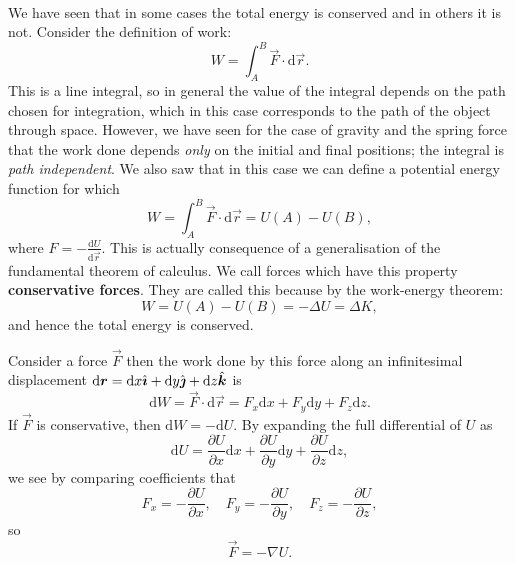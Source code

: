 \documentclass[../newtonian_mechanics.tex]{subfiles}
\begin{document}
        \paragraph{}
        We have seen that in some cases the total energy is conserved and in others it is not.
        Consider the definition of work:
        \begin{equation}
            W=\int_A^B \vec{F}\cdot\mathrm{d}\vec{r}.
        \end{equation}
        This is a line integral, so in general the value of the integral depends on the path chosen for integration, which in this case corresponds to the path of the object through space.
        However, we have seen for the case of gravity and the spring force that the work done depends \textit{only} on the initial and final positions; the integral is \textit{path independent}.
        We also saw that in this case we can define a potential energy function for which
        \begin{equation}
            W=\int_A^B \vec{F}\cdot\mathrm{d}\vec{r} = U(A) - U(B),
        \end{equation}
        where $F=-\frac{\mathrm{d}U}{\mathrm{d}\vec{r}}$.
        This is actually consequence of a generalisation of the fundamental theorem of calculus.
        We call forces which have this property \textbf{conservative forces}.
        They are called this because by the work-energy theorem:
        \begin{equation}
            W = U(A) - U(B) = -\Delta U = \Delta K,
        \end{equation}
        and hence the total energy is conserved.
        \begin{example}
            Consider a force $\vec{F}$ then the work done by this force along an infinitesimal displacement $\mathrm{d}\boldsymbol{r}=\mathrm{d}x\hat{\boldsymbol{\imath}}+\mathrm{d}y\hat{\boldsymbol{\jmath}}+\mathrm{d}z\hat{\boldsymbol{k}}$ is
            \begin{equation}
                \mathrm{d}W = \vec{F}\cdot\mathrm{d}\vec{r}=F_x\mathrm{d}x+F_y\mathrm{d}y+F_z\mathrm{d}z.
            \end{equation}
            If $\vec{F}$ is conservative, then $\mathrm{d}W=-\mathrm{d}U$. By expanding the full differential of $U$ as
            \begin{equation}
                \mathrm{d}U=\frac{\partial U}{\partial x}\mathrm{d}x+\frac{\partial U}{\partial y}\mathrm{d}y+\frac{\partial U}{\partial z}\mathrm{d}z,
            \end{equation}
            we see by comparing coefficients that
            \begin{equation}
                F_x=-\frac{\partial U}{\partial x}, \quad F_y=-\frac{\partial U}{\partial y}, \quad F_z=-\frac{\partial U}{\partial z},
            \end{equation}
            so
            \begin{equation}
                \vec{F}=-\nabla U.
            \end{equation}
        \end{example}
\end{document}
